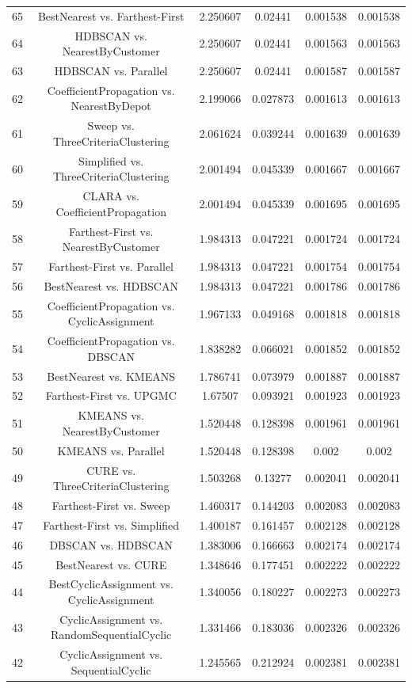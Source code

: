 \documentclass[a4paper,10pt]{article}
\begin{document}
\begin{landscape}
\begin{table}[!htp]
\begin{tabular}{cccccc}
65&BestNearest vs. Farthest-First&2.250607&0.02441&0.001538&0.001538\\
64&HDBSCAN vs. NearestByCustomer&2.250607&0.02441&0.001563&0.001563\\
63&HDBSCAN vs. Parallel&2.250607&0.02441&0.001587&0.001587\\
62&CoefficientPropagation vs. NearestByDepot&2.199066&0.027873&0.001613&0.001613\\
61&Sweep vs. ThreeCriteriaClustering&2.061624&0.039244&0.001639&0.001639\\
60&Simplified vs. ThreeCriteriaClustering&2.001494&0.045339&0.001667&0.001667\\
59&CLARA vs. CoefficientPropagation&2.001494&0.045339&0.001695&0.001695\\
58&Farthest-First vs. NearestByCustomer&1.984313&0.047221&0.001724&0.001724\\
57&Farthest-First vs. Parallel&1.984313&0.047221&0.001754&0.001754\\
56&BestNearest vs. HDBSCAN&1.984313&0.047221&0.001786&0.001786\\
55&CoefficientPropagation vs. CyclicAssignment&1.967133&0.049168&0.001818&0.001818\\
54&CoefficientPropagation vs. DBSCAN&1.838282&0.066021&0.001852&0.001852\\
53&BestNearest vs. KMEANS&1.786741&0.073979&0.001887&0.001887\\
52&Farthest-First vs. UPGMC&1.67507&0.093921&0.001923&0.001923\\
51&KMEANS vs. NearestByCustomer&1.520448&0.128398&0.001961&0.001961\\
50&KMEANS vs. Parallel&1.520448&0.128398&0.002&0.002\\
49&CURE vs. ThreeCriteriaClustering&1.503268&0.13277&0.002041&0.002041\\
48&Farthest-First vs. Sweep&1.460317&0.144203&0.002083&0.002083\\
47&Farthest-First vs. Simplified&1.400187&0.161457&0.002128&0.002128\\
46&DBSCAN vs. HDBSCAN&1.383006&0.166663&0.002174&0.002174\\
45&BestNearest vs. CURE&1.348646&0.177451&0.002222&0.002222\\
44&BestCyclicAssignment vs. CyclicAssignment&1.340056&0.180227&0.002273&0.002273\\
43&CyclicAssignment vs. RandomSequentialCyclic&1.331466&0.183036&0.002326&0.002326\\
42&CyclicAssignment vs. SequentialCyclic&1.245565&0.212924&0.002381&0.002381\\

\end{tabular}
\end{table}
\end{landscape}
\end{document}
